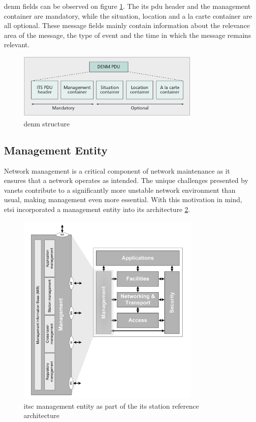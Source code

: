 \gls{denm} fields can be observed on figure \ref{fig:denm_structure}. The \gls{its} \gls{pdu} header and the management container are mandatory, while the situation, location and a la carte container are all optional. These message fields mainly contain information about the relevance area of the message, the type of event and the time in which the message remains relevant.~\cite{al-sultan_comprehensive_2014}

\begin{figure}[htbp]
    \centering
    \includegraphics[width=0.8\textwidth]{Chapters/Figures/VANETs/denm_structure.png}
   	\caption{\gls{denm} structure~\cite{festag_cooperative_2014}}
   	\label{fig:denm_structure}
\end{figure}


\subsection[Management Entity]{Management Entity}
\label{subsec:Security_of_VANETs}
Network management is a critical component of network maintenance as it ensures that a network operates as intended. The unique challenges presented by \glspl{vanet} contribute to a significantly more unstable network environment than usual, making management even more essential. With this motivation in mind, \gls{etsi} incorporated a management entity into its architecture \ref{fig:management_entity}.

\begin{figure}[htbp]
\centering
\includegraphics[width=0.8\textwidth]{Chapters/Figures/VANETs/management_entity.png}
   	\caption{\gls{itsc} management entity as part of the \gls{its} station reference architecture~\cite{etsi_intelligent_2010}}
   	\label{fig:management_entity}
\end{figure}



